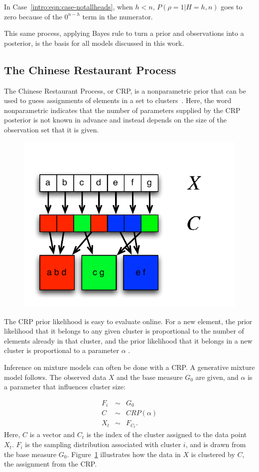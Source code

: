 In Case~\ref{intro:eqn:case-notallheads}, when $h<n$, $P(\rho=1|H=h,n)$ goes to zero because of the $0^{n-h}$ term in the numerator.

This same process, applying Bayes rule to turn a prior and observations into a posterior, is the basis for all models discussed in this work.

\subsection{The Chinese Restaurant Process}

The Chinese Restaurant Process, or CRP, is a nonparametric prior that can be used to guess assignments of elements in a set to clusters~\cite{teh2010dirichlet}. Here, the word nonparametric indicates that the number of parameters supplied by the CRP posterior is not known in advance and instead depends on the size of the observation set that it is given.

\begin{figure}[t]
\begin{center}
\includegraphics[width=0.4\linewidth]{figures/crp-mixture.pdf}
\caption{}
\label{intro:crp-mixture}
\end{center}
\end{figure}


The CRP prior likelihood is easy to evaluate online. For a new element, the prior likelihood that it belongs to any given cluster is proportional to the number of elements already in that cluster, and the prior likelihood that it belongs in a new cluster is proportional to a parameter $\alpha$ .

Inference on mixture models can often be done with a CRP. A generative mixture model follows. The observed data $X$ and the base measure $G_0$ are given, and $\alpha$ is a parameter that influences cluster size:

\begin{eqnarray}
F_i&\sim&G_0\\
C&\sim&CRP(\alpha)\\
X_t&\sim&F_{C_t}.
\end{eqnarray}
Here, $C$ is a vector and $C_t$ is the index of the cluster assigned to the data point $X_t$. $F_i$ is the sampling distribution associated with cluster $i$, and is drawn from the base measure $G_0$. Figure~\ref{intro:crp-mixture} illustrates how the data in $X$ is clustered by $C$, the assignment from the CRP.


